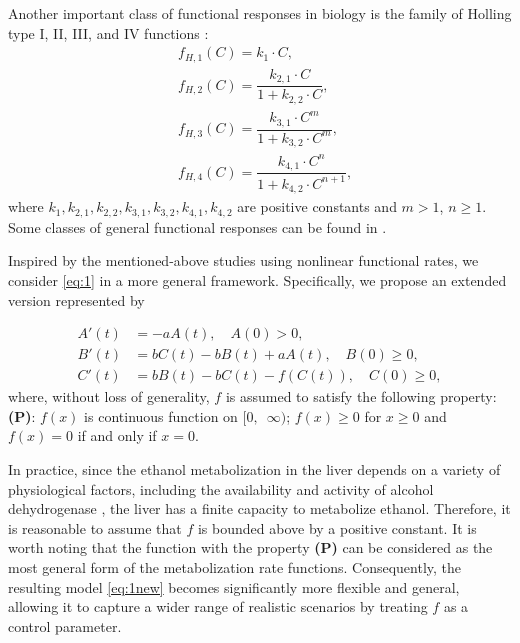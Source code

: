 \documentclass[12pt]{article}
\theoremstyle{definition}
\theoremstyle{remark}
\numberwithin{equation}{section}
\begin{document}
% 
% 
Another important class of functional responses in biology is the family of Holling type I, II, III, and IV functions \cite{Dawes1,Wu1}:
\begin{equation*}
\begin{split}
&f_{H, 1} \left( C \right) =  k_{1} \cdot C, \\
&f_{H, 2} \left( C \right) = \dfrac{k_{2, 1} \cdot C}{1 + k_{2, 2} \cdot C}, \\
&f_{H, 3} \left( C \right) = \dfrac{k_{3, 1} \cdot C^{m}}{1 + k_{3, 2} \cdot C^{m}}, \\
&f_{H, 4} \left( C \right) = \dfrac{k_{4, 1} \cdot C^{n}}{1 + k_{4,2} \cdot C^{n + 1}},
\end{split}
\end{equation*}
where $k_{1}, k_{2, 1}, k_{2, 2}, k_{3, 1}, k_{3, 2}, k_{4, 1}, k_{4, 2}$ are positive constants and  $m > 1$, $n \geq 1$. Some classes of general functional responses can be found in \cite{Kalinkat1}.



Inspired by the mentioned-above studies using nonlinear functional rates,  we consider \eqref{eq:1} in a more general framework. Specifically, we propose an extended version represented by


\begin{equation}\label{eq:1new}
\begin{split}
A'(t) &= -a A(t), \quad A(0) > 0,\\
B'(t) &= b C(t) - b B(t) + aA(t),\quad B(0) \geq 0,\\
C'(t) &= b B(t)- b C(t)- f(C(t)), \quad C(0) \geq 0,
\end{split}
\end{equation}
where, without loss of generality, $f$ is assumed to satisfy the following property:\\
\textbf{(P)}: $f(x)$ is continuous function on $[0, \,\,\,\infty)$; $f(x) \geq 0$ for $x \geq 0$ and $f(x) = 0$ if and only if $x = 0$.

In practice, since the ethanol metabolization in the liver depends on a variety of physiological factors, including the availability and activity of alcohol dehydrogenase \cite{Edenberg1}, the liver has a finite capacity to metabolize ethanol. Therefore, it is reasonable to assume that $f$ is bounded above by a positive constant. It is worth noting that the function with the property \textbf{(P)} can be considered as the most general form of the metabolization rate functions. Consequently, the resulting model \eqref{eq:1new} becomes significantly more flexible and general, allowing it to capture a wider range of realistic scenarios by treating $f$ as a control parameter.
\end{document}
